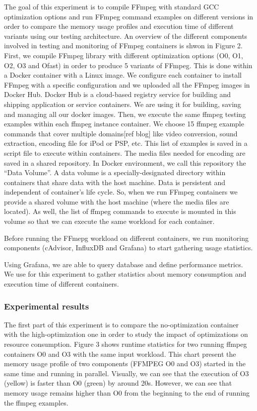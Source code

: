 The goal of this experiment is to compile FFmpeg with standard GCC optimization options and run FFmpeg command examples on different versions in order to compare the memory usage profiles and execution time of different variants using our testing architecture. An overview of the different components involved in testing and monitoring of FFmpeg containers is shwon in Figure 2. 
First, we compile FFmpeg library with different optimization options  (O0, O1, O2, O3 and Ofast) in order to produce 5 variants of FFmpeg. This is done within a Docker container with a Linux image. We configure
each container to install FFmpeg with a specific configuration and we uploaded all the FFmpeg images in Docker Hub.
Docker Hub is a cloud-based registry service for building and shipping application or
service containers. We are using it for building, saving and managing all our docker
images.
 Then, we execute the same ffmpeg testing examples within each ffmpeg instance container. We choose 15 ffmpeg example commands that cover multiple domains[ref blog] like video conversion, sound extraction, encoding file for iPod or PSP, etc. This list of examples is saved in a script file to execute within containers. The media files needed for encoding are saved in a shared repository. In Docker environment, we call this repository the “Data Volume”. A data volume is a specially-designated directory within containers that share data with the host machine. Data is persistent and independent of container’s life cycle. So, when we run FFmpeg containers we provide a shared volume with the host
machine (where the media files are located). As well, the list of ffmpeg commands to execute is mounted in this volume so that we can execute the same workload for each container.

Before running the FFmepg workload on different containers, we run monitoring components (cAdvisor, InfluxDB and Grafana) to start gathering usage statistics.

Using Grafana, we are able to query database and define performance metrics. We use for this experiment to gather statistics about memory consumption and execution time of different containers. 

\subsubsection{Experimental results}

The first part of this experiment is to compare the no-optimization container with the high-optimization one in order to study the impact of optimizations on resource consumption. Figure 3 shows runtime statistics for two running ffmpeg containers O0 and O3 with the same input workload. This chart present the memory usage profile of two components (FFMPEG O0 and O3) started in the same time and running in parallel. Visually, we can see that the execution of O3 (yellow) is faster than O0 (green) by around 20s. However, we can see that memory usage remains higher than O0 from the beginning to the end of running the ffmpeg examples. 

